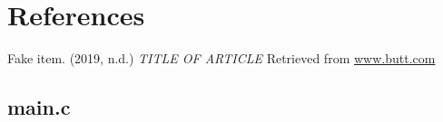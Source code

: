 \documentclass[a4paper, 12pt]{article}
\begin{document}
\newpage

\section{References}

    \begin{thebibliography}{9}
            Fake item. (2019, n.d.) \textit{TITLE OF ARTICLE} Retrieved from \url{www.butt.com}
    \end{thebibliography}

\newpage

\begin{appendices}

\section{main.c}

\end{appendices}
\end{document}
